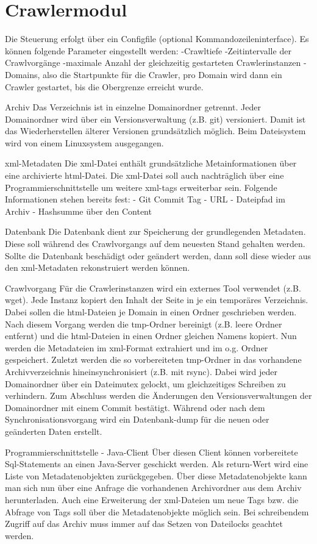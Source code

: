 \chapter{Crawlermodul}

Die Steuerung erfolgt über ein Configfile (optional Kommandozeileninterface).
Es können folgende Parameter eingestellt werden:
	-Crawltiefe
	-Zeitintervalle der Crawlvorgänge
	-maximale Anzahl der gleichzeitig gestarteten Crawlerinstanzen
	-Domains, also die Startpunkte für die Crawler, pro Domain wird dann ein Crawler gestartet,
		bis die Obergrenze erreicht wurde.

Archiv
Das Verzeichnis ist in einzelne Domainordner getrennt. Jeder Domainordner wird über ein Versionsverwaltung
(z.B. git) versioniert. Damit ist das Wiederherstellen älterer Versionen grundsätzlich möglich.
Beim Dateisystem wird von einem Linuxsystem ausgegangen.

xml-Metadaten
Die xml-Datei enthält grundsätzliche Metainformationen über eine archivierte html-Datei.
Die xml-Datei soll auch nachträglich über eine Programmierschnittstelle um weitere xml-tags erweiterbar sein.
Folgende Informationen stehen bereits fest: 
- Git Commit Tag
- URL
- Dateipfad im Archiv
- Hashsumme über den Content

Datenbank
Die Datenbank dient zur Speicherung der grundlegenden Metadaten.
Diese soll während des Crawlvorgangs auf dem neuesten Stand gehalten werden.
Sollte die Datenbank beschädigt oder geändert werden, dann soll diese wieder aus den
xml-Metadaten rekonstruiert werden können.
 
Crawlvorgang
Für die Crawlerinstanzen wird ein externes Tool verwendet (z.B. wget).
Jede Instanz kopiert den Inhalt der Seite in je ein temporäres Verzeichnis.
Dabei sollen die html-Dateien je Domain in einen Ordner geschrieben werden.
Nach diesem Vorgang werden die tmp-Ordner bereinigt (z.B. leere Ordner entfernt)
und die html-Dateien in einen Ordner gleichen Namens kopiert.
Nun werden die Metadateien im xml-Format extrahiert und im o.g. Ordner gespeichert.
Zuletzt werden die so vorbereiteten tmp-Ordner in das vorhandene Archivverzeichnis
hineinsynchronisiert (z.B. mit rsync). Dabei wird jeder Domainordner über ein Dateimutex gelockt, um
gleichzeitiges Schreiben zu verhindern.
Zum Abschluss werden die Änderungen den Versionsverwaltungen der Domainordner mit einem Commit bestätigt.
Während oder nach dem Synchronisationsvorgang wird ein Datenbank-dump für die neuen oder geänderten Daten
erstellt. 

Programmierschnittstelle - Java-Client
Über diesen Client können vorbereitete Sql-Statements an einen Java-Server geschickt werden. Als return-Wert
wird eine Liste von Metadatenobjekten zurückgegeben.
Über diese Metadatenobjekte kann man sich nun über eine Anfrage die vorhandenen Archivordner aus dem Archiv herunterladen.
Auch eine Erweiterung der xml-Dateien um neue Tags bzw. die Abfrage von Tags soll über die 
Metadatenobjekte möglich sein.
Bei schreibendem Zugriff auf das Archiv muss immer auf das Setzen von Dateilocks geachtet werden.


 
